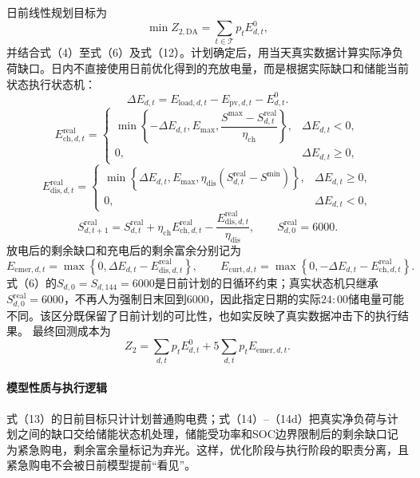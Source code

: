 \documentclass{cumcmthesis}
\newcommand{\Tset}{\mathcal{T}}
\begin{document}
日前线性规划目标为
\begin{equation}
\min Z_{2,\mathrm{DA}}=\sum_{t\in\Tset}p_tE^0_{d,t},
\tag{13}
\end{equation}
并结合式（4）至式（6）及式（12）。计划确定后，用当天真实数据计算实际净负荷缺口。日内不直接使用日前优化得到的充放电量，而是根据实际缺口和储能当前状态执行状态机：
\begin{equation}
\Delta E_{d,t}=E_{\mathrm{load},d,t}-E_{\mathrm{pv},d,t}-E^0_{d,t}.
\tag{14}
\end{equation}
\begin{equation}
E_{\mathrm{ch},d,t}^{\mathrm{real}}=
\begin{cases}
\min\left\{-\Delta E_{d,t},E_{\max},
\dfrac{S^{\max}-S_{d,t}^{\mathrm{real}}}{\eta_{\mathrm{ch}}}\right\},&\Delta E_{d,t}<0,\\
0,&\Delta E_{d,t}\geq0,
\end{cases}
\tag{14a}
\end{equation}
\begin{equation}
E_{\mathrm{dis},d,t}^{\mathrm{real}}=
\begin{cases}
\min\left\{\Delta E_{d,t},E_{\max},
\eta_{\mathrm{dis}}(S_{d,t}^{\mathrm{real}}-S^{\min})\right\},&\Delta E_{d,t}\geq0,\\
0,&\Delta E_{d,t}<0,
\end{cases}
\tag{14b}
\end{equation}
\begin{equation}
S_{d,t+1}^{\mathrm{real}}=S_{d,t}^{\mathrm{real}}+\eta_{\mathrm{ch}}E_{\mathrm{ch},d,t}^{\mathrm{real}}
-\frac{E_{\mathrm{dis},d,t}^{\mathrm{real}}}{\eta_{\mathrm{dis}}},\qquad S_{d,0}^{\mathrm{real}}=6000.
\tag{14c}
\end{equation}
放电后的剩余缺口和充电后的剩余富余分别记为
\begin{equation}
E_{\mathrm{emer},d,t}=\max\left\{0,\Delta E_{d,t}-E_{\mathrm{dis},d,t}^{\mathrm{real}}\right\},\qquad
E_{\mathrm{curt},d,t}=\max\left\{0,-\Delta E_{d,t}-E_{\mathrm{ch},d,t}^{\mathrm{real}}\right\}.
\tag{14d}
\end{equation}
式（6）的$S_{d,0}=S_{d,144}=6000$是日前计划的日循环约束；真实状态机只继承$S_{d,0}^{\mathrm{real}}=6000$，不再人为强制日末回到6000，因此指定日期的实际$24{:}00$储电量可能不同。该区分既保留了日前计划的可比性，也如实反映了真实数据冲击下的执行结果。
最终回测成本为
\begin{equation}
Z_2=\sum_{d,t}p_tE^0_{d,t}+5\sum_{d,t}p_tE_{\mathrm{emer},d,t}.
\tag{15}
\end{equation}
\paragraph{模型性质与执行逻辑}
式（13）的日前目标只计计划普通购电费；式（14）--（14d）把真实净负荷与计划之间的缺口交给储能状态机处理，储能受功率和SOC边界限制后的剩余缺口记为紧急购电，剩余富余量标记为弃光。这样，优化阶段与执行阶段的职责分离，且紧急购电不会被日前模型提前“看见”。
\end{document}

